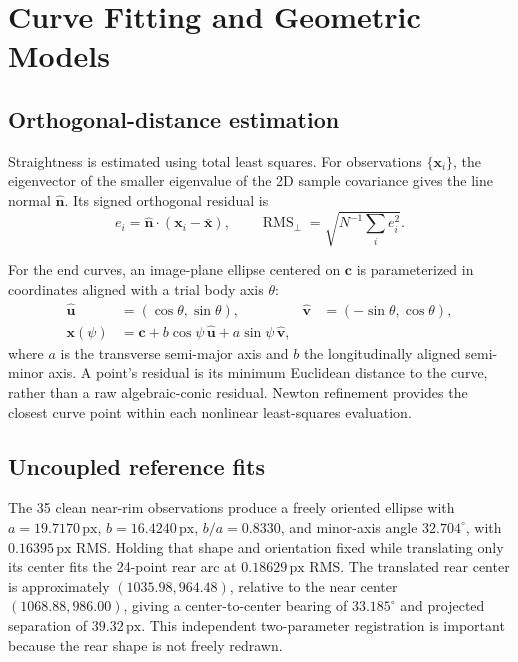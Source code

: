 \documentclass[11pt,letterpaper]{article}
\newcommand{\rms}{\operatorname{RMS}}
\newcommand{\px}{\,\mathrm{px}}
\newcommand{\mat}[1]{\mathbf{#1}}
\begin{document}
\section{Curve Fitting and Geometric Models}
\label{sec:models}

\subsection{Orthogonal-distance estimation}

Straightness is estimated using total least squares. For observations \(\{\mat x_i\}\), the eigenvector of the smaller eigenvalue of the 2D sample covariance gives the line normal \(\hat{\mat n}\). Its signed orthogonal residual is
\begin{equation}
 e_i=\hat{\mat n}\cdot(\mat x_i-\bar{\mat x}),\qquad
 \rms_{\perp}=\sqrt{N^{-1}\sum_i e_i^2}.
\end{equation}

For the end curves, an image-plane ellipse centered on \(\mat c\) is parameterized in coordinates aligned with a trial body axis \(\theta\):
\begin{align}
 \hat{\mat u}&=(\cos\theta,\sin\theta), &
 \hat{\mat v}&=(-\sin\theta,\cos\theta),\\
 \mat x(\psi)&=\mat c+b\cos\psi\,\hat{\mat u}
 +a\sin\psi\,\hat{\mat v},
 \label{eq:ellipse}
\end{align}
where \(a\) is the transverse semi-major axis and \(b\) the longitudinally aligned semi-minor axis. A point's residual is its minimum Euclidean distance to the curve, rather than a raw algebraic-conic residual. Newton refinement provides the closest curve point within each nonlinear least-squares evaluation.

\subsection{Uncoupled reference fits}

The 35 clean near-rim observations produce a freely oriented ellipse with \(a=19.7170\px\), \(b=16.4240\px\), \(b/a=0.8330\), and minor-axis angle \(32.704^\circ\), with \(0.16395\px\) RMS. Holding that shape and orientation fixed while translating only its center fits the 24-point rear arc at \(0.18629\px\) RMS. The translated rear center is approximately \((1035.98,964.48)\), relative to the near center \((1068.88,986.00)\), giving a center-to-center bearing of \(33.185^\circ\) and projected separation of \(39.32\px\). This independent two-parameter registration is important because the rear shape is not freely redrawn.
\end{document}
